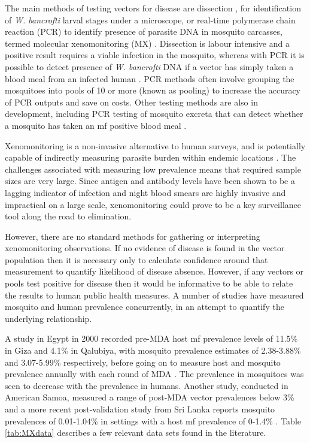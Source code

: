 The main methods of testing vectors for disease are dissection \cite{Pi2018}, for identification of \textit{W. bancrofti} larval stages under a microscope, or real-time polymerase chain reaction (PCR) to identify presence of parasite DNA in mosquito carcasses, termed molecular xenomonitoring (MX) \cite{Dorkenoo2018,Irish2018}. Dissection is labour intensive and a positive result requires a viable infection in the mosquito, whereas with PCR it is possible to detect presence of \textit{W. bancrofti} DNA if a vector has simply taken a blood meal from an infected human \cite{Zaky2018}. PCR methods often involve grouping the mosquitoes into pools of 10 or more (known as pooling) to increase the accuracy of PCR outputs and save on costs. Other testing methods are also in development, including PCR testing of mosquito excreta that can detect whether a mosquito has taken an mf positive blood meal \cite{Pilotte2016}. 

Xenomonitoring is a non-invasive alternative to human surveys, and is potentially capable of indirectly measuring parasite burden within endemic locations \cite{Rao2016,Lau2016}. The challenges associated with measuring low prevalence means that required sample sizes are very large. Since antigen and antibody levels have been shown to be a lagging indicator of infection \cite{Peck2019} and night blood smears are highly invasive and impractical on a large scale, xenomonitoring could prove to be a key surveillance tool along the road to elimination.

However, there are no standard methods for gathering or interpreting xenomonitoring observations. If no evidence of disease is found in the vector population then it is necessary only to calculate confidence around that measurement to quantify likelihood of disease absence. However, if any vectors or pools test positive for disease then it would be informative to be able to relate the results to human public health measures. A number of studies have measured mosquito and human prevalence concurrently, in an attempt to quantify the underlying relationship. 

A study in Egypt in 2000 recorded pre-MDA host mf prevalence levels of 11.5\% in Giza and 4.1\% in Qalubiya, with mosquito prevalence estimates of 2.38-3.88\% and 3.07-5.99\% respectively, before going on to measure host and mosquito prevalence annually with each round of MDA \cite{Farid2001,Farid2007}. The prevalence in mosquitoes was seen to decrease with the prevalence in humans. Another study, conducted in American Samoa, measured a range of post-MDA vector prevalences below 3\% \cite{Schmaedick2014} and a more recent post-validation study from Sri Lanka reports mosquito prevalences of 0.01-1.04\% in settings with a host mf prevalence of 0-1.4\% \cite{Rao2016}. Table \ref{tab:MXdata} describes a few relevant data sets found in the literature. 

